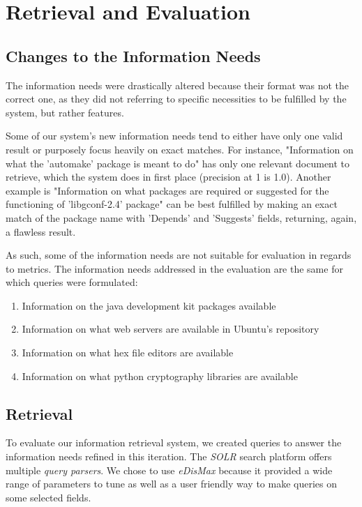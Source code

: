 \section{Retrieval and Evaluation}

\subsection{Changes to the Information Needs}

The information needs were drastically altered because their format was not the correct one, as they did not referring to specific necessities to be fulfilled by the system, but rather features. 

Some of our system's new information needs tend to either have only one valid result or purposely focus heavily on exact matches. For instance, "Information on what the 'automake' package is meant to do" has only one relevant document to retrieve, which the system does in first place (precision at 1 is 1.0). Another example is "Information on what packages are required or suggested for the functioning of ’libgconf-2.4’ package" can be best fulfilled by making an exact match of the package name with 'Depends' and 'Suggests' fields, returning, again, a flawless result.

As such, some of the information needs are not suitable for evaluation in regards to metrics. The information needs addressed in the evaluation are the same for which queries were formulated: %

\begin{enumerate}
    \item Information on the java development kit packages available
    \item Information on what web servers are available in Ubuntu's repository
    \item Information on what hex file editors are available
    \item Information on what python cryptography libraries are available
\end{enumerate}

\subsection{Retrieval}

To evaluate our information retrieval system, we created queries to answer the information needs refined in this iteration. The \emph{SOLR} search platform offers multiple \emph{query parsers}. We chose to use \emph{eDisMax} because it provided a wide range of parameters to tune as well as a user friendly way to make queries on some selected fields. 

